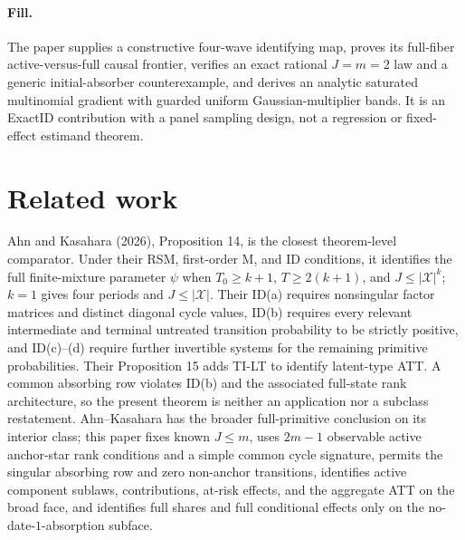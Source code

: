 \documentclass{article}
\begin{document}
\paragraph{Fill.} The paper supplies a constructive four-wave identifying map, proves its full-fiber active-versus-full causal frontier, verifies an exact rational \(J=m=2\) law and a generic initial-absorber counterexample, and derives an analytic saturated multinomial gradient with guarded uniform Gaussian-multiplier bands.  It is an ExactID contribution with a panel sampling design, not a regression or fixed-effect estimand theorem.

\section{Related work}

Ahn and Kasahara (2026), Proposition 14, is the closest theorem-level comparator.  Under their RSM, first-order M, and ID conditions, it identifies the full finite-mixture parameter \(\psi\) when \(T_0\geq k+1\), \(T\geq2(k+1)\), and \(J\leq|\mathcal X|^k\); \(k=1\) gives four periods and \(J\leq|\mathcal X|\).  Their ID(a) requires nonsingular factor matrices and distinct diagonal cycle values, ID(b) requires every relevant intermediate and terminal untreated transition probability to be strictly positive, and ID(c)--(d) require further invertible systems for the remaining primitive probabilities.  Their Proposition 15 adds TI-LT to identify latent-type ATT.  A common absorbing row violates ID(b) and the associated full-state rank architecture, so the present theorem is neither an application nor a subclass restatement.  Ahn--Kasahara has the broader full-primitive conclusion on its interior class; this paper fixes known \(J\leq m\), uses \(2m-1\) observable active anchor-star rank conditions and a simple common cycle signature, permits the singular absorbing row and zero non-anchor transitions, identifies active component sublaws, contributions, at-risk effects, and the aggregate ATT on the broad face, and identifies full shares and full conditional effects only on the no-date-\(1\)-absorption subface.
\end{document}
